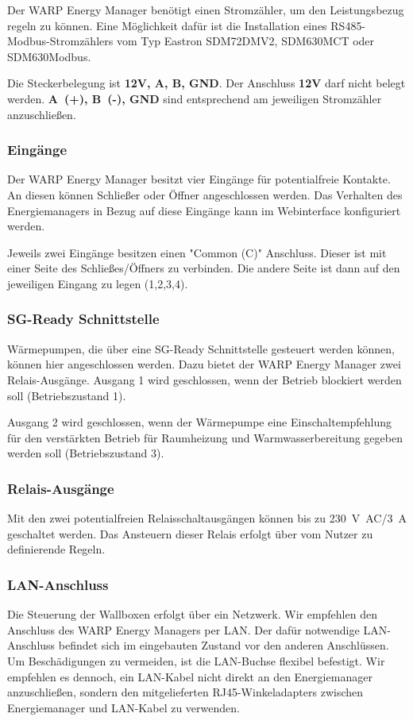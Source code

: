 \documentclass[a4paper,10pt]{article}
\begin{document}
\begin{multicols*}{2}
	Der WARP Energy Manager benötigt einen Stromzähler, um den Leistungsbezug regeln zu
	können. Eine Möglichkeit dafür ist die Installation eines RS485-Modbus-Stromzählers vom Typ Eastron SDM72DMV2, SDM630MCT oder SDM630Modbus.

	Die Steckerbelegung ist \textbf{12V, A, B, GND}. Der Anschluss \textbf{12V}
	darf nicht belegt werden. \textbf{A~(+), B~(-), GND} sind entsprechend
	am jeweiligen Stromzähler anzuschließen.
    
    
    \subsubsection{Eingänge}
	Der WARP Energy Manager besitzt vier Eingänge für potentialfreie Kontakte.
	An diesen können Schließer oder Öffner angeschlossen werden. Das Verhalten des
	Energiemanagers in Bezug auf diese Eingänge kann im Webinterface konfiguriert werden.

    Jeweils zwei Eingänge besitzen einen "Common (C)" Anschluss. Dieser ist mit einer Seite des Schließes/Öffners
    zu verbinden. Die andere Seite ist dann auf den jeweiligen Eingang zu legen (1,2,3,4).

	\subsubsection{SG-Ready Schnittstelle}
    Wärmepumpen, die über eine SG-Ready Schnittstelle gesteuert werden können, können hier angeschlossen werden.
    Dazu bietet der WARP Energy Manager zwei Relais-Ausgänge. Ausgang 1 wird geschlossen, wenn der Betrieb blockiert werden soll (Betriebszustand 1).
    
    Ausgang 2 wird geschlossen, wenn der Wärmepumpe eine Einschaltempfehlung für den verstärkten Betrieb für Raumheizung und Warmwasserbereitung gegeben werden soll (Betriebszustand 3).

	\subsubsection{Relais-Ausgänge}
	Mit den zwei potentialfreien Relaisschaltausgängen können bis zu \SI{230}{\volt AC}/\SI{3}{\ampere} geschaltet
	werden. Das Ansteuern dieser Relais erfolgt über vom Nutzer zu definierende Regeln.

	\subsubsection{LAN-Anschluss}
	Die Steuerung der Wallboxen erfolgt über ein Netzwerk. Wir empfehlen den
	Anschluss des WARP Energy Managers per LAN. Der dafür notwendige LAN-Anschluss
	befindet sich im eingebauten Zustand vor den anderen Anschlüssen. Um Beschädigungen
	zu vermeiden, ist die LAN-Buchse flexibel befestigt. Wir empfehlen es dennoch, ein LAN-Kabel
	nicht direkt an den Energiemanager anzuschließen, sondern den mitgelieferten RJ45-Winkeladapters zwischen Energiemanager und LAN-Kabel zu verwenden.


\end{multicols*}
\end{document}
